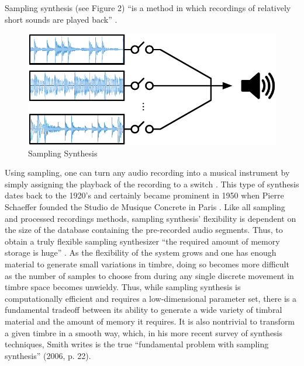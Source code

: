 \documentclass[12pt]{report} 	%
\numberwithin{figure}{chapter}
\numberwithin{table}{chapter}
\numberwithin{equation}{chapter}
\begin{document}
\begin{flushleft}
Sampling synthesis (see Figure 2) ``is a method in which recordings of relatively short sounds are played back'' \cite[p. 10]{Tolonen:1998bh}. 
\begin{figure}[h!]
\begin{center}
\includegraphics[scale=0.8]{SamplingSynthesis}
\caption[Sampling synthesis]{Sampling Synthesis}
\end{center}
\vspace{6pt}
\end{figure}
Using sampling, one can turn any audio recording into a musical instrument by simply assigning the playback of the recording to a switch \cite[p. 1]{Heise:2009sp}. This type of synthesis dates back to the 1920's and certainly became prominent in 1950 when Pierre Schaeffer founded the Studio de Musique Concrete in Paris \cite[p. 3]{Tolonen:1998bh}. Like all sampling and processed recordings methods, sampling synthesis' flexibility is dependent on the size of the database containing the pre-recorded audio segments. Thus, to obtain a truly flexible sampling synthesizer ``the required amount of memory storage is huge'' \cite[p. 11]{Tolonen:1998bh}. As the flexibility of the system grows and one has enough material to generate small variations in timbre, doing so becomes more difficult as the number of samples to choose from during any single discrete movement in timbre space becomes unwieldy. Thus, while sampling synthesis is computationally efficient and requires a low-dimensional parameter set, there is a fundamental tradeoff between its ability to generate a wide variety of timbral material and the amount of memory it requires. It is also nontrivial to transform a given timbre in a smooth way, which, in his more recent survey of synthesis techniques, Smith writes is the true ``fundamental problem with sampling synthesis'' (2006, p. 22).


\end{flushleft}
\end{document}
